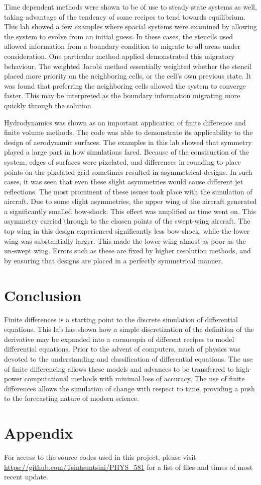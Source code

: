 \documentclass[twocolumn]{article}
\begin{document}
Time dependent methods were shown to be of use to steady state systems as well, taking advantage of the tendency of some recipes to tend towards equilibrium. This lab showed a few examples where spacial systems were examined by allowing the system to evolve from an initial guess. In these cases, the stencils used allowed information from a boundary condition to migrate to all areas under consideration. One particular method applied demonstrated this migratory behaviour. The weighted Jacobi method essentially weighted whether the stencil placed more priority on the neighboring cells, or the cell's own previous state. It was found that preferring the neighboring cells allowed the system to converge faster. This may be interpreted as the boundary information migrating more quickly through the solution.

Hydrodynamics was shown as an important application of finite difference and finite volume methods. The code was able to demonstrate its applicability to the design of aerodynamic surfaces. The examples in this lab showed that symmetry played a large part in how simulations fared. Because of the construction of the system, edges of surfaces were pixelated, and differences in rounding to place points on the pixelated grid sometimes resulted in asymmetrical designs. In such cases, it was seen that even these slight asymmetries would cause different jet reflections. The most prominent of these issues took place with the simulation of aircraft. Due to some slight asymmetries, the upper wing of the aircraft generated a significantly smalled bow-shock. This effect was amplified as time went on. This asymmetry carried through to the chosen points of the swept-wing aircraft. The top wing in this design experienced significantly less bow-shock, while the lower wing was substantially larger. This made the lower wing almost as poor as the un-swept wing. Errors such as these are fixed by higher resolution methods, and by ensuring that designs are placed in a perfectly symmetrical manner.

\section{Conclusion}
Finite differences is a starting point to the discrete simulation of differential equations. This lab has shown how a simple discretization of the definition of the derivative may be expanded into a cornucopia of different recipes to model differential equations. Prior to the advent of computers, much of physics was devoted to the understanding and classification of differential equations. The use of finite differencing allows these models and advances to be transferred to high-power computational methods with minimal loss of accuracy. The use of finite differences allows the simulation of change with respect to time, providing a push to the forecasting nature of modern science.

\section{Appendix}
For access to the source codes used in this project, please visit \url{https://github.com/Tsintsuntsini/PHYS_581} for a list of files and times of most recent update.
	
\end{document}
